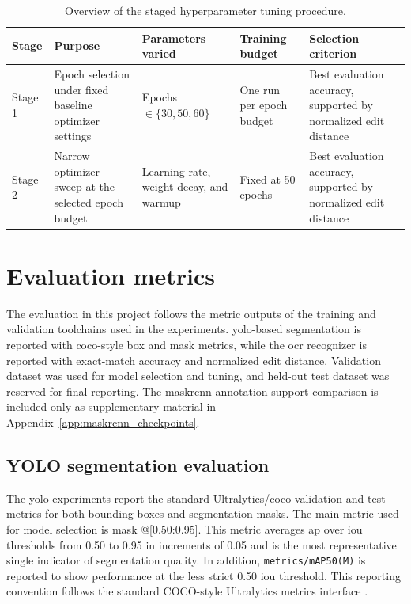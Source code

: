 \begin{table}[htbp]
    \centering
    \caption{Overview of the staged  hyperparameter tuning procedure.}
    \label{tab:ocr_hparam_tuning}
    \begin{tabular}{p{1.6cm} p{3.8cm} p{4.5cm} p{3.0cm} p{3.3cm}}
        \toprule
        Stage & Purpose & Parameters varied & Training budget & Selection criterion \\
        \midrule
        Stage 1 & Epoch selection under fixed baseline optimizer settings & Epochs $\in \{30, 50, 60\}$ & One run per epoch budget & Best evaluation accuracy, supported by normalized edit distance \\
        Stage 2 & Narrow optimizer sweep at the selected epoch budget & Learning rate, weight decay, and warmup & Fixed at 50 epochs & Best evaluation accuracy, supported by normalized edit distance \\
        \bottomrule
    \end{tabular}
\end{table}

\section{Evaluation metrics}

The evaluation in this project follows the metric outputs of the training and
validation toolchains used in the experiments. \gls{yolo}-based segmentation is
reported with \gls{coco}-style box and mask metrics, while the \gls{ocr}
recognizer is reported with exact-match accuracy and normalized edit distance.
Validation dataset was used for model selection and tuning, and held-out test
dataset was reserved for final reporting. The \gls{maskrcnn} annotation-support
comparison is included only as supplementary material in
Appendix~\ref{app:maskrcnn_checkpoints}.

\subsection{YOLO segmentation evaluation}

The \gls{yolo} experiments report the standard Ultralytics/\gls{coco} validation
and test metrics for both bounding boxes and segmentation masks. The main metric
used for model selection is mask @[0.50:0.95]. This metric averages \gls{ap} over
\gls{iou} thresholds from 0.50 to 0.95 in increments of 0.05 and is the most
representative single indicator of segmentation quality. In addition,
\texttt{metrics/mAP50(M)} is reported to show performance at the less strict 0.50
\gls{iou} threshold. This reporting convention follows the standard COCO-style
Ultralytics metrics interface \citep{lin2014coco,ultralyticsdocs2026}.

